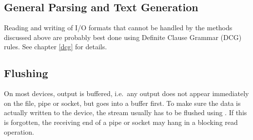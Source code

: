 %
%
%
%
%


\subsection{General Parsing and Text Generation}

Reading and writing of I/O formats that cannot be handled by the methods
discussed above are probably best done using Definite Clause Grammar
(DCG) rules. See chapter \ref{dcg} for details.


\subsection{Flushing}
On most devices, output is buffered, i.e.\ any output does not appear
immediately on the file, pipe or socket, but goes into a buffer first.
To make sure the data is actually written to the device, the stream
usually has to be flushed using
.
If this is forgotten, the receiving end of a pipe or socket may hang
in a blocking read operation.

